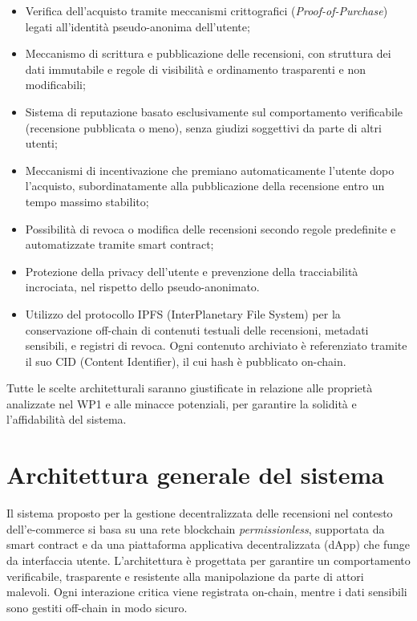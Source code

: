         \begin{itemize}
            \item Verifica dell'acquisto tramite meccanismi crittografici (\textit{Proof-of-Purchase}) legati all'identità pseudo-anonima dell'utente;
            
            \item Meccanismo di scrittura e pubblicazione delle recensioni, con struttura dei dati immutabile e regole di visibilità e ordinamento trasparenti e non modificabili;
        
            \item Sistema di reputazione basato esclusivamente sul comportamento verificabile (recensione pubblicata o meno), senza giudizi soggettivi da parte di altri utenti;
        
            \item Meccanismi di incentivazione che premiano automaticamente l'utente dopo l'acquisto, subordinatamente alla pubblicazione della recensione entro un tempo massimo stabilito;
        
            \item Possibilità di revoca o modifica delle recensioni secondo regole predefinite e automatizzate tramite smart contract;
        
            \item Protezione della privacy dell'utente e prevenzione della tracciabilità incrociata, nel rispetto dello pseudo-anonimato.
    
            \item Utilizzo del protocollo IPFS (InterPlanetary File System) per la conservazione off-chain di contenuti testuali delle recensioni, metadati sensibili, e registri di revoca.
            Ogni contenuto archiviato è referenziato tramite il suo CID (Content Identifier), il cui hash è pubblicato on-chain.
        \end{itemize}

    \noindent Tutte le scelte architetturali saranno giustificate in relazione alle proprietà analizzate nel WP1 e alle minacce potenziali, per garantire la solidità e l'affidabilità del sistema.

    \section{Architettura generale del sistema}
        Il sistema proposto per la gestione decentralizzata delle recensioni nel contesto dell’e-commerce si basa su una rete blockchain \textit{permissionless}, supportata da smart contract e da una piattaforma applicativa decentralizzata (dApp) che funge da interfaccia utente. L'architettura è progettata per garantire un comportamento verificabile, trasparente e resistente alla manipolazione da parte di attori malevoli. Ogni interazione critica viene registrata on-chain, mentre i dati sensibili sono gestiti off-chain in modo sicuro.
        
